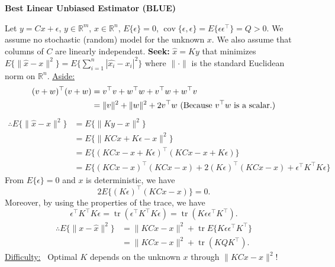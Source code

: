 \documentclass[letterpaper]{article}
\newcommand{\real}{\mathbb R}  %
\begin{document}
\begin{center}
    \textbf{Best Linear Unbiased Estimator (BLUE)}
\end{center}
    Let $y=Cx+\epsilon$, $y\in \mathbb{R}^m$, $x \in \mathbb{R}^n$, $E\{\epsilon\}=0$, $\operatorname{cov}\{\epsilon,\epsilon\}=E\{\epsilon \epsilon^\top \}=Q>0$.
    \newline
    We assume no stochastic (random) model for the unknown $x$. We also assume that columns of $C$ are linearly independent.
    \newline
    \textbf{Seek:} $\hat{x}=Ky$ that minimizes $E\{\|\hat{x}-x\|^2\}=E\{ \sum \limits_{i=1}^n |\hat{x_i}-x_i|^2\} $ where $\|\cdot \|$ is the standard Euclidean norm on $\real^n$.
    \newline\newline
    \underline{Aside:}~
    \begin{align*}
        (v+w)^\top (v+w)&=v^\top v+w^\top w+v^\top w+w^\top v\\
        &=\|v\|^2+\|w\|^2+2v^\top w\textnormal{ (Because } v^\top w \textnormal{ is a scalar.)}
    \end{align*}
    \begin{align*}
        \therefore E\{\|\hat{x}-x\|^2\}&=E\{\|Ky-x\|^2\}\\
        &= E\{\|KCx+K\epsilon-x\|^2\}\\
        & =E\{(KCx-x+K\epsilon)^\top (KCx-x+K\epsilon)\}\\
        & =E\{(KCx-x)^\top(KCx-x)+2(K\epsilon)^\top(KCx-x)+\epsilon^\top  K^\top  K \epsilon\}
    \end{align*}
    From $E\{\epsilon\}=0$ and $x$ is deterministic, we have
    \begin{equation*}
        2E\{(K\epsilon)^\top(KCx-x)\}=0.
    \end{equation*}
    Moreover, by using the properties of the trace, we have
    \begin{equation*}
        \epsilon^\top K^\top K\epsilon= \operatorname{tr}\left( \epsilon^\top K^\top K\epsilon \right)=\operatorname{tr}\left(K\epsilon\epsilon^\top K^\top\right).
    \end{equation*}
    \begin{align*}
        \therefore E\{\|x-\hat{x}\|^2\}&=\|KCx-x\|^2+\operatorname{tr}E\{K\epsilon\epsilon^\top K^\top\}\\
        &=\|KCx-x\|^2 + \operatorname{tr}(KQK^\top ).
    \end{align*}
    \underline{Difficulty:}~ Optimal $K$ depends on the unknown $x$ through $\|KCx-x\|^2$!
\end{document}
